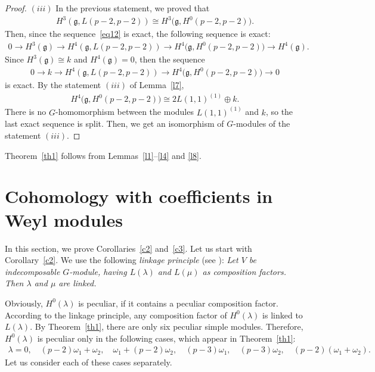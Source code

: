 \documentclass[pdftex]{sigma}%
\numberwithin{equation}{section}
\begin{document}
\begin{proof}
 $(iii)$ In the previous statement, we proved that
\begin{gather*}
H^3(\mathfrak{g},L(p-2,p-2))\cong H^3\big(\mathfrak{g},H^0(p-2,p-2)\big).
\end{gather*}
Then, since the sequence~\eqref{eq12} is exact, the following sequence is exact:
\begin{gather*}
0\longrightarrow H^3(\mathfrak{g})\longrightarrow H^4(\mathfrak{g},L(p-2,p-2))\longrightarrow H^4\big(\mathfrak{g},H^0(p-2,p-2)\big)\longrightarrow H^4(\mathfrak{g}).
\end{gather*}
Since $H^3(\mathfrak{g})\cong k$ and $H^4(\mathfrak{g})=0$, then the sequence
\begin{gather*}
0\longrightarrow k\longrightarrow H^4(\mathfrak{g},L(p-2,p-2))\longrightarrow H^4\big(\mathfrak{g},H^0(p-2,p-2)\big)\longrightarrow 0
\end{gather*}
is exact. By the statement $(iii)$ of Lemma~\ref{l7},
\begin{gather*}
H^4\big(\mathfrak{g},H^0(p-2,p-2)\big)\cong 2L(1,1)^{(1)}\oplus k.
\end{gather*}
There is no $G$-homomorphism between the modules $L(1,1)^{(1)}$ and $k$, so the last exact sequence is split. Then, we get an isomorphism of $G$-modules of the statement $(iii)$.
\end{proof}

Theorem~\ref{th1} follows from Lemmas~\ref{l1}--\ref{l4} and \ref{l8}.

\section{Cohomology with coefficients in Weyl modules}

In this section, we prove Corollaries~\ref{c2} and~\ref{c3}.
Let us start with Corollary~\ref{c2}. We use the following {\it linkage principle} (see \cite[p.~264]{Humph80}):
{\it Let $V$ be indecomposable $G$-module, having $L(\lambda)$ and $L(\mu)$ as composition factors. Then $\lambda$ and $\mu$ are linked.}

Obviously, $H^0(\lambda)$ is peculiar, if it contains a peculiar composition factor.
According to the linkage principle, any composition factor of $H^0(\lambda)$ is linked to $L(\lambda)$. By Theorem~\ref{th1}, there are only six peculiar simple modules. Therefore, $H^0(\lambda)$ is peculiar only in the following cases, which appear in Theorem~\ref{th1}:
\begin{gather*}
\lambda=0,\quad
(p-2)\omega_1+\omega_2,\quad
\omega_1+(p-2)\omega_2,\quad
(p-3)\omega_1,\quad
(p-3)\omega_2,\quad
(p-2)(\omega_1+\omega_2).
\end{gather*}
Let us consider each of these cases separately.
\end{document}
